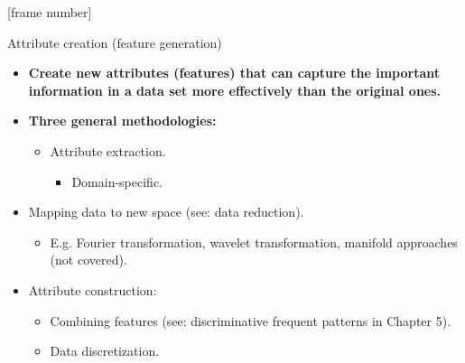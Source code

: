 \documentclass[aspectratio=169,t]{beamer}
\begin{document}
  {
    [frame number]
    \begin{frame}{Attribute creation (feature generation)}
    \begin{itemize}
      \item \textbf{Create new attributes (features) that can capture the important information in a data set more effectively than the original ones.}
      \item \textbf{Three general methodologies:}
      \begin{itemize}
        \item Attribute extraction.
        \begin{itemize}
          \item Domain-specific.
        \end{itemize}
      \end{itemize}
      \item Mapping data to new space (see: data reduction).
      \begin{itemize}
        \item E.g. Fourier transformation, wavelet transformation, manifold approaches (not covered).
      \end{itemize}
      \item Attribute construction:
      \begin{itemize}
        \item Combining features (see: discriminative frequent patterns in Chapter 5).
        \item Data discretization.
      \end{itemize}
    \end{itemize}
    \end{frame}
  }
\end{document}
